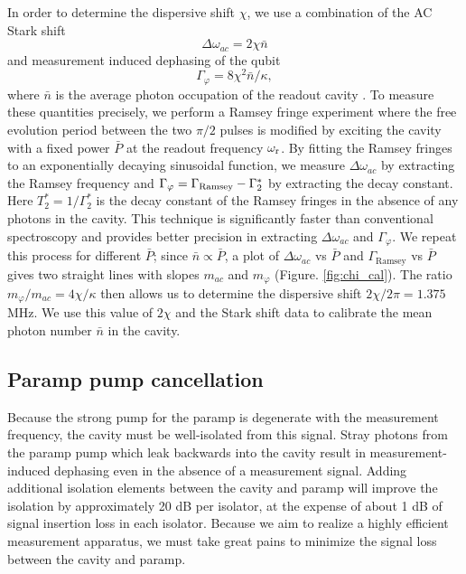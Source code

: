 In order to determine the dispersive shift $\chi$, we use a combination of the AC Stark shift
\begin{equation}
\Delta \omega_{ac} = 2\chi \bar{n}
\label{eq:ac_stark}
\end{equation}
and measurement induced dephasing of the qubit
\begin{equation}
\Gamma_{\varphi} = 8\chi^2 \bar{n}/\kappa,
\label{eq:gamma_phi}
\end{equation}
where $\bar{n}$ is the average photon occupation of the readout cavity \cite{schusteracstark}. To measure these quantities precisely, we perform a Ramsey fringe experiment where the free evolution period between the two $\pi / 2$ pulses is modified by exciting the cavity with a fixed power $\bar{P}$ at the readout frequency $\omega_{\rm r}$. By fitting the Ramsey fringes to an exponentially decaying sinusoidal function, we measure $\Delta \omega_{ac}$ by extracting the Ramsey frequency and $\Gamma_{\varphi} = \Gamma_{\rm Ramsey} - \Gamma_2^*$ by extracting the decay constant. Here $T^\ast_{2} = 1/\Gamma^\ast_{2}$ is the decay constant of the Ramsey fringes in the absence of any photons in the cavity. This technique is significantly faster than conventional spectroscopy \cite{schusteracstark} and provides better precision in extracting $\Delta \omega_{ac}$  and $\Gamma_{\varphi}$. We repeat this process for different $\bar{P}$; since $\bar{n} \propto \bar{P}$, a plot of $\Delta \omega_{ac}$ vs $\bar{P}$ and $\Gamma_{\mathrm{Ramsey}}$ vs $\bar{P}$ gives two straight lines with slopes $m_{ac}$ and $m_{\varphi}$ (Figure. \ref{fig:chi_cal}). The ratio $m_{\varphi}/m_{ac} = 4\chi/\kappa$ then allows us to determine the dispersive shift $2\chi / 2 \pi = 1.375$ MHz. We use this value of $2\chi$ and the Stark shift data to calibrate the mean photon number $\bar{n}$ in the cavity.

\subsection{Paramp pump cancellation}

Because the strong pump for the paramp is degenerate with the measurement frequency, the cavity must be well-isolated from this signal.  Stray photons from the paramp pump which leak backwards into the cavity result in measurement-induced dephasing even in the absence of a measurement signal.  Adding additional isolation elements between the cavity and paramp will improve the isolation by approximately 20 dB per isolator, at the expense of about 1 dB of signal insertion loss in each isolator.  Because we aim to realize a highly efficient measurement apparatus, we must take great pains to minimize the signal loss between the cavity and paramp.

